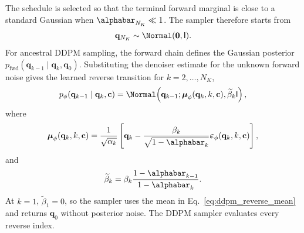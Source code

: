 The schedule is selected so that the terminal forward marginal is close to a
standard Gaussian when $\alphabar_{N_K}\ll1$. The sampler therefore starts from
\begin{equation}
    \mathbf{q}_{N_K}\sim\Normal(\mathbf{0},\mathsf{I}).
    \label{eq:sampling_seed}
\end{equation}
For ancestral DDPM sampling, the forward chain defines the Gaussian posterior
$p_{\mathrm{fwd}}(\mathbf{q}_{k-1}\mid\mathbf{q}_k,\mathbf{q}_0)$. Substituting
the denoiser estimate for the unknown forward noise gives the learned reverse
transition for $k=2,\ldots,N_K$,
\begin{equation}
    p_\phi(\mathbf{q}_{k-1}\mid\mathbf{q}_k,\mathbf{c})
    =
    \Normal\!\left(
        \mathbf{q}_{k-1};
        \boldsymbol{\mu}_\phi(\mathbf{q}_k,k,\mathbf{c}),
        \widetilde{\beta}_k\mathsf{I}
    \right),
    \label{eq:ddpm_reverse_density}
\end{equation}
where
\begin{equation}
    \boldsymbol{\mu}_\phi(\mathbf{q}_k,k,\mathbf{c})
    =
    \frac{1}{\sqrt{\alpha_k}}
    \left[
        \mathbf{q}_k
        -
        \frac{\beta_k}{\sqrt{1-\alphabar_k}}
        \boldsymbol{\varepsilon}_\phi(\mathbf{q}_k,k,\mathbf{c})
    \right],
    \label{eq:ddpm_reverse_mean}
\end{equation}
and
\begin{equation}
    \widetilde{\beta}_k
    =
    \beta_k\frac{1-\alphabar_{k-1}}{1-\alphabar_k}.
    \label{eq:ddpm_reverse_variance}
\end{equation}
At $k=1$, $\widetilde{\beta}_1=0$, so the sampler uses the mean in
Eq.~\eqref{eq:ddpm_reverse_mean} and returns $\mathbf{q}_0$ without posterior
noise. The DDPM sampler evaluates every reverse index.


